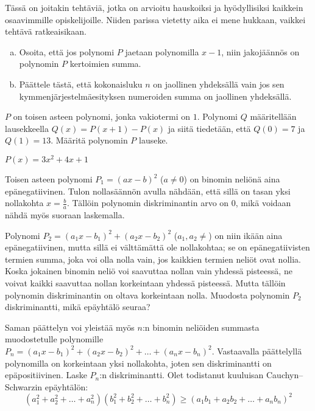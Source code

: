 Tässä on joitakin tehtäviä, jotka on arvioitu hauskoiksi ja hyödyllisiksi kaikkein osaavimmille opiskelijoille. Niiden parissa vietetty aika ei mene hukkaan, vaikkei tehtävä ratkeaisikaan.

\begin{tehtava}
    \begin{enumerate}[a)]
        \item Osoita, että jos polynomi $P$ jaetaan polynomilla $x-1$, niin jakojäännös on polynomin $P$ kertoimien summa.
        \item Päättele tästä, että kokonaisluku $n$ on jaollinen yhdeksällä vain jos sen kymmenjärjestelmäesityksen numeroiden summa on jaollinen yhdeksällä.
    \end{enumerate}
\end{tehtava}

\begin{tehtava}
    $P$ on toisen asteen polynomi, jonka vakiotermi on $1$. Polynomi $Q$ määritellään lausekkeella $Q(x)=P(x+1)-P(x)$ ja siitä tiedetään, että $Q(0)=7$ ja $Q(1)=13$. Määritä polynomin $P$ lauseke.
    \begin{vastaus}
        $P(x) = 3x^2+4x+1$
    \end{vastaus}
\end{tehtava}

\begin{tehtava} %
Toisen asteen polynomi $P_1 = (ax-b)^2$ ($a \neq 0 $) on binomin neliönä aina epänegatiivinen. Tulon nollasäännön avulla nähdään, että sillä on tasan yksi nollakohta $x = \frac{b}{a}$. Tällöin polynomin diskriminantin arvo on 0, mikä voidaan nähdä myös suoraan laskemalla.

Polynomi $P_2 = (a_1x-b_1)^2+(a_2x-b_2)^2$ ($a_1,a_2 \neq $) on niin ikään aina epänegatiivinen, mutta sillä ei välttämättä ole nollakohtaa; se on epänegatiivisten termien summa, joka voi olla nolla vain, jos kaikkien termien neliöt ovat nollia. Koska jokainen binomin neliö voi saavuttaa nollan vain yhdessä pisteessä, ne voivat kaikki saavuttaa nollan korkeintaan yhdessä pisteessä. Mutta tällöin polynomin diskriminantin on oltava korkeintaan nolla. Muodosta polynomin $P_2$ diskriminantti, mikä epäyhtälö seuraa?

Saman päättelyn voi yleistää myös $n$:n binomin neliöiden summasta muodostetulle polynomille $P_n = (a_1x-b_1)^2+(a_2x-b_2)^2+\ldots+(a_nx-b_n)^2$. Vastaavalla päättelyllä polynomilla on korkeintaan yksi nollakohta, joten sen diskriminantti on epäpositiivinen. Laske $P_n$:n diskriminantti. Olet todistanut kuuluisan Cauchyn--Schwarzin epäyhtälön:
\[
(a_1^2+a_2^2+\ldots+a_n^2)(b_1^2+b_2^2+\ldots+b_n^2) \geq (a_1b_1+a_2b_2+\ldots+a_nb_n)^2
\]

\end{tehtava}
